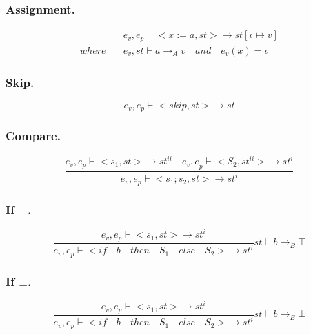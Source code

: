\subsubsection{Assignment.}
\begin{align*}
	&{ e }_{ v },{ e }_{ p }\vdash <x:=a,st>\rightarrow st[\iota \mapsto v]\\
	where\quad &{ e }_{ v },st\vdash a{ \rightarrow  }_{ A }v\quad and\quad  { e }_{ v }(x)=\iota 
\end{align*}


\subsubsection{Skip.}
\begin{equation}
	{ e }_{ v },{ e }_{ p }\vdash <skip,st>\rightarrow st
\end{equation}


\subsubsection{Compare.}
\begin{equation}
	\frac { { e }_{ v },{ e }_{ p }\vdash <{ s }_{ 1 },st>\rightarrow { st }^{ ii }\quad { e }_{ v }{ ,e }_{ p }\vdash <{ S }_{ 2 },{ st }^{ ii }>\rightarrow { st }^{ i } }{ { e }_{ v },{ e }_{ p }\vdash <{ s }_{ 1 };{ s }_{ 2 },st>\rightarrow { st }^{ i } } 
\end{equation}


\subsubsection{If $\top$.}
\begin{equation}
	\frac { { e }_{ v },{ e }_{ p }\vdash <{ s }_{ 1 },st>\rightarrow { st }^{ i } }{ { e }_{ v },{ e }_{ p }\vdash <if\quad b\quad then\quad { S }_{ 1 }\quad else{ \quad S }_{ 2 }>\rightarrow { st }^{ i } } st\vdash b{ \rightarrow  }_{ B }\top 
\end{equation}

\subsubsection{If $\bot$.}
\begin{equation}
	\frac { { e }_{ v },{ e }_{ p }\vdash <{ s }_{ 1 },st>\rightarrow { st }^{ i } }{ { e }_{ v },{ e }_{ p }\vdash <if\quad b\quad then\quad { S }_{ 1 }\quad else{ \quad S }_{ 2 }>\rightarrow { st }^{ i } } st\vdash b{ \rightarrow  }_{ B }\bot 
\end{equation}

\begin{comment}
\subsubsection{While $\top$.}
\begin{equation}

\end{equation}

\subsubsection{While $\bot$.}
\begin{equation}

\end{equation}

\end{comment}